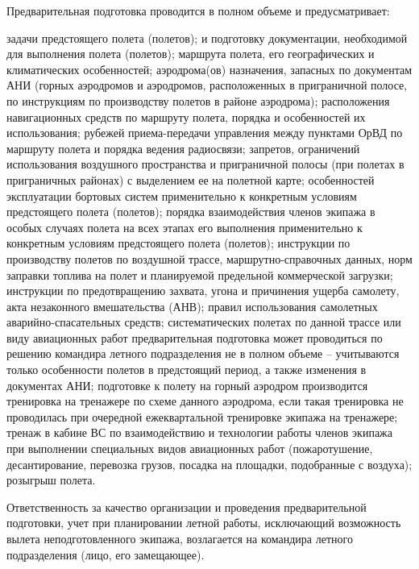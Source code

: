 Предварительная подготовка проводится в полном объеме и предусматривает:
\begin{itemize}
     задачи предстоящего полета (полетов);
     и подготовку документации, необходимой для выполнения полета (полетов);
     маршрута полета, его географических и климатических особенностей;
     аэродрома(ов) назначения, запасных по документам АНИ (горных аэродромов и аэродромов, расположенных в приграничной полосе, по инструкциям по производству полетов в районе аэродрома);
     расположения навигационных средств по маршруту полета, порядка и особенностей их
использования;
     рубежей приема-передачи управления между пунктами ОрВД по маршруту полета и порядка ведения радиосвязи;
     запретов, ограничений использования воздушного пространства и приграничной полосы (при полетах в приграничных районах) с выделением ее на полетной карте;
     особенностей эксплуатации бортовых систем применительно к конкретным условиям предстоящего полета (полетов);
     порядка взаимодействия членов экипажа в особых случаях полета на всех этапах его выполнения применительно к конкретным условиям предстоящего полета (полетов);
     инструкции по производству полетов по воздушной трассе, маршрутно-справочных данных, норм заправки топлива на полет и планируемой предельной коммерческой загрузки;
     инструкции по предотвращению захвата, угона и причинения ущерба самолету, акта незаконного вмешательства (АНВ);
     правил использования самолетных аварийно-спасательных средств;
     систематических полетах по данной трассе или виду авиационных работ предварительная подготовка может проводиться по решению командира летного подразделения не в полном объеме – учитываются только особенности полетов в предстоящий период, а также изменения в документах АНИ;
     подготовке к полету на горный аэродром производится тренировка на тренажере по схеме 
данного аэродрома, если такая тренировка не проводилась при очередной ежеквартальной тренировке экипажа на тренажере;
     тренаж в кабине ВС по взаимодействию и технологии работы членов экипажа при выполнении специальных видов авиационных работ (пожаротушение, десантирование, перевозка грузов, посадка на площадки, подобранные с воздуха);
     розыгрыш полета.
\end{itemize}

Ответственность за качество организации и проведения предварительной подготовки, учет при планировании летной работы, исключающий возможность вылета неподготовленного экипажа, возлагается на командира летного подразделения (лицо, его замещающее).


